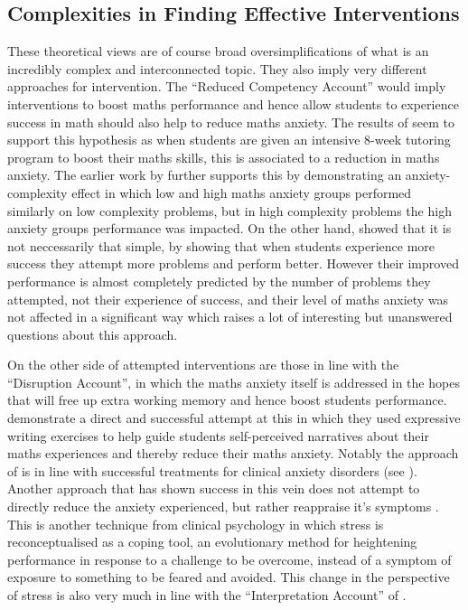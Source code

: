 \documentclass[twoside,12pt,a4paper]{report}
\begin{document}
\subsection*{Complexities in Finding Effective Interventions}

These theoretical views are of course broad oversimplifications of what is an incredibly complex and interconnected topic. They also imply very different approaches for intervention. The ``Reduced Competency Account'' would imply interventions to boost maths performance and hence allow students to experience success in math should also help to reduce maths anxiety. The results of   seem to support this hypothesis as when students are given an intensive 8-week tutoring program to boost their maths skills, this is associated to a reduction in maths anxiety. The earlier work by  further supports this by demonstrating an anxiety-complexity effect in which low and high maths anxiety groups performed similarly on low complexity problems, but in high complexity problems the high anxiety groups performance was impacted. On the other hand,  showed that it is not neccessarily that simple, by showing that when students experience more success they attempt more problems and perform better. However their improved performance is almost completely predicted by the number of problems they attempted, not their experience of success, and their level of maths anxiety was not affected in a significant way which raises a lot of interesting but unanswered questions about this approach. 
	
On the other side of attempted interventions are those in line with the ``Disruption Account'', in which the maths anxiety itself is addressed in the hopes that will free up extra working memory and hence boost students performance.   demonstrate a direct and successful attempt at this in which they used expressive writing exercises to help guide students self-perceived narratives about their maths experiences and thereby reduce their maths anxiety. Notably the approach of  is in line with successful treatments for clinical anxiety disorders (see ). Another approach that has shown success in this vein does not attempt to directly reduce the anxiety experienced, but rather reappraise it's symptoms \cite{Jamieson2016}. This is another technique from clinical psychology in which stress is reconceptualised as a coping tool, an evolutionary method for heightening performance in response to a challenge to be overcome, instead of a symptom of exposure to something to be feared and avoided. This change in the perspective of stress is also very much in line with the ``Interpretation Account'' of .
\end{document}
